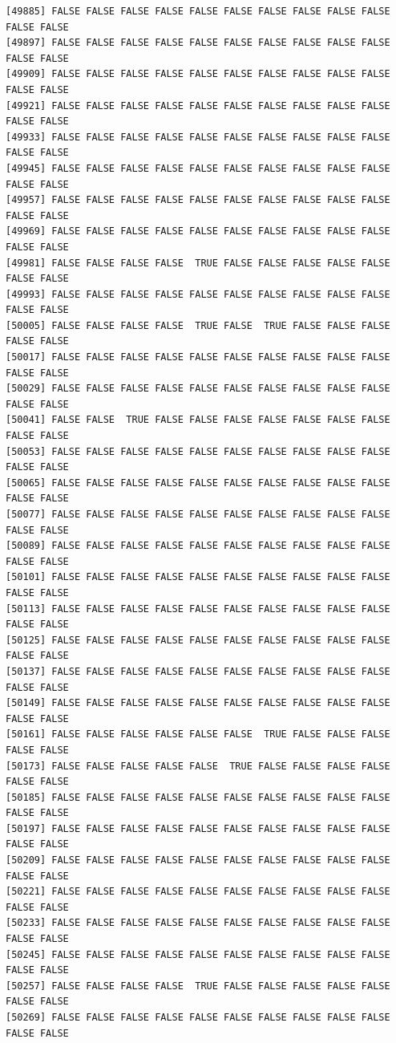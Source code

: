 \documentclass[
  a4paper,
  DIV=11,
  numbers=noendperiod]{scrartcl}
\begin{document}
\begin{verbatim}
[49885] FALSE FALSE FALSE FALSE FALSE FALSE FALSE FALSE FALSE FALSE FALSE FALSE
[49897] FALSE FALSE FALSE FALSE FALSE FALSE FALSE FALSE FALSE FALSE FALSE FALSE
[49909] FALSE FALSE FALSE FALSE FALSE FALSE FALSE FALSE FALSE FALSE FALSE FALSE
[49921] FALSE FALSE FALSE FALSE FALSE FALSE FALSE FALSE FALSE FALSE FALSE FALSE
[49933] FALSE FALSE FALSE FALSE FALSE FALSE FALSE FALSE FALSE FALSE FALSE FALSE
[49945] FALSE FALSE FALSE FALSE FALSE FALSE FALSE FALSE FALSE FALSE FALSE FALSE
[49957] FALSE FALSE FALSE FALSE FALSE FALSE FALSE FALSE FALSE FALSE FALSE FALSE
[49969] FALSE FALSE FALSE FALSE FALSE FALSE FALSE FALSE FALSE FALSE FALSE FALSE
[49981] FALSE FALSE FALSE FALSE  TRUE FALSE FALSE FALSE FALSE FALSE FALSE FALSE
[49993] FALSE FALSE FALSE FALSE FALSE FALSE FALSE FALSE FALSE FALSE FALSE FALSE
[50005] FALSE FALSE FALSE FALSE  TRUE FALSE  TRUE FALSE FALSE FALSE FALSE FALSE
[50017] FALSE FALSE FALSE FALSE FALSE FALSE FALSE FALSE FALSE FALSE FALSE FALSE
[50029] FALSE FALSE FALSE FALSE FALSE FALSE FALSE FALSE FALSE FALSE FALSE FALSE
[50041] FALSE FALSE  TRUE FALSE FALSE FALSE FALSE FALSE FALSE FALSE FALSE FALSE
[50053] FALSE FALSE FALSE FALSE FALSE FALSE FALSE FALSE FALSE FALSE FALSE FALSE
[50065] FALSE FALSE FALSE FALSE FALSE FALSE FALSE FALSE FALSE FALSE FALSE FALSE
[50077] FALSE FALSE FALSE FALSE FALSE FALSE FALSE FALSE FALSE FALSE FALSE FALSE
[50089] FALSE FALSE FALSE FALSE FALSE FALSE FALSE FALSE FALSE FALSE FALSE FALSE
[50101] FALSE FALSE FALSE FALSE FALSE FALSE FALSE FALSE FALSE FALSE FALSE FALSE
[50113] FALSE FALSE FALSE FALSE FALSE FALSE FALSE FALSE FALSE FALSE FALSE FALSE
[50125] FALSE FALSE FALSE FALSE FALSE FALSE FALSE FALSE FALSE FALSE FALSE FALSE
[50137] FALSE FALSE FALSE FALSE FALSE FALSE FALSE FALSE FALSE FALSE FALSE FALSE
[50149] FALSE FALSE FALSE FALSE FALSE FALSE FALSE FALSE FALSE FALSE FALSE FALSE
[50161] FALSE FALSE FALSE FALSE FALSE FALSE  TRUE FALSE FALSE FALSE FALSE FALSE
[50173] FALSE FALSE FALSE FALSE FALSE  TRUE FALSE FALSE FALSE FALSE FALSE FALSE
[50185] FALSE FALSE FALSE FALSE FALSE FALSE FALSE FALSE FALSE FALSE FALSE FALSE
[50197] FALSE FALSE FALSE FALSE FALSE FALSE FALSE FALSE FALSE FALSE FALSE FALSE
[50209] FALSE FALSE FALSE FALSE FALSE FALSE FALSE FALSE FALSE FALSE FALSE FALSE
[50221] FALSE FALSE FALSE FALSE FALSE FALSE FALSE FALSE FALSE FALSE FALSE FALSE
[50233] FALSE FALSE FALSE FALSE FALSE FALSE FALSE FALSE FALSE FALSE FALSE FALSE
[50245] FALSE FALSE FALSE FALSE FALSE FALSE FALSE FALSE FALSE FALSE FALSE FALSE
[50257] FALSE FALSE FALSE FALSE  TRUE FALSE FALSE FALSE FALSE FALSE FALSE FALSE
[50269] FALSE FALSE FALSE FALSE FALSE FALSE FALSE FALSE FALSE FALSE FALSE FALSE

\end{verbatim}
\end{document}
